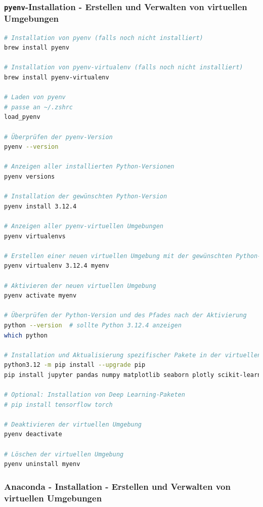 \documentclass{vorlage-design-main}
\begin{document}
\subsubsection{\texorpdfstring{\texttt{pyenv}-Installation - Erstellen
und Verwalten von virtuellen
Umgebungen}{pyenv-Installation - Erstellen und Verwalten von virtuellen Umgebungen}}\label{pyenv-installation---erstellen-und-verwalten-von-virtuellen-umgebungen}

\begin{lstlisting}[language=bash]
# Installation von pyenv (falls noch nicht installiert)
brew install pyenv

# Installation von pyenv-virtualenv (falls noch nicht installiert)
brew install pyenv-virtualenv

# Laden von pyenv
# passe an ~/.zshrc
load_pyenv

# Überprüfen der pyenv-Version
pyenv --version

# Anzeigen aller installierten Python-Versionen
pyenv versions

# Installation der gewünschten Python-Version
pyenv install 3.12.4

# Anzeigen aller pyenv-virtuellen Umgebungen
pyenv virtualenvs

# Erstellen einer neuen virtuellen Umgebung mit der gewünschten Python-Version
pyenv virtualenv 3.12.4 myenv

# Aktivieren der neuen virtuellen Umgebung
pyenv activate myenv

# Überprüfen der Python-Version und des Pfades nach der Aktivierung
python --version  # sollte Python 3.12.4 anzeigen
which python

# Installation und Aktualisierung spezifischer Pakete in der virtuellen Umgebung
python3.12 -m pip install --upgrade pip
pip install jupyter pandas numpy matplotlib seaborn plotly scikit-learn scipy pyqt5

# Optional: Installation von Deep Learning-Paketen
# pip install tensorflow torch

# Deaktivieren der virtuellen Umgebung
pyenv deactivate

# Löschen der virtuellen Umgebung
pyenv uninstall myenv
\end{lstlisting}

\subsubsection{Anaconda - Installation - Erstellen und Verwalten von
virtuellen
Umgebungen}\label{anaconda---installation---erstellen-und-verwalten-von-virtuellen-umgebungen}
\end{document}
